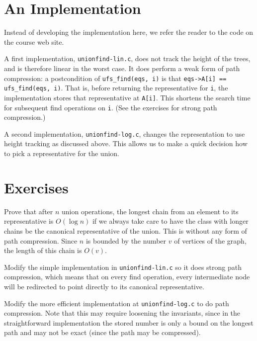 \section{An Implementation}
\label{sec:unionfind:implementation}

Instead of developing the implementation here, we refer the reader to the code
on the course web site.

A first implementation, \lstinline'unionfind-lin.c', does not track
the height of the trees, and is therefore linear in the worst case.
It does perform a weak form of path compression: a postcondition of
\lstinline'ufs_find(eqs, i)' is that %
\lstinline'eqs->A[i] == ufs_find(eqs, i)'. That is, before returning
the representative for \lstinline'i', the implementation stores that
representative at \lstinline'A[i]'. This shortens the search time for
subsequent find operations on \lstinline'i'. (See the exercises for
strong path compression.)

A second implementation, \lstinline'unionfind-log.c', changes the
representation to use height tracking as discussed above.  This allows
us to make a quick decision how to pick a representative for the
union.

\clearpage
\section{Exercises}
\label{sec:unionfind:exercises}

\begin{exercise}
  \label{exc:ufs-log}
  Prove that after $n$ union operations, the longest chain from an element to
  its representative is $O(\log n)$ if we always take care to have the class
  with longer chains be the canonical representative of the union.  This is
  without any form of path compression.  Since $n$ is bounded by the
  number $v$ of vertices of the graph, the length of this chain is $O(v)$.
\end{exercise}

\begin{exercise}
  Modify the simple implementation in \lstinline'unionfind-lin.c'
  so it does strong path compression, which means that on every find
  operation, every intermediate node will be redirected to point
  directly to its canonical representative.
\end{exercise}

\begin{exercise}
  Modify the more efficient implementation at \lstinline'unionfind-log.c' to
  do path compression.  Note that this may require loosening the invariants,
  since in the straightforward implementation the stored number is only a
  bound on the longest path and may not be exact (since the path may be
  compressed).
\end{exercise}

% 
% 

